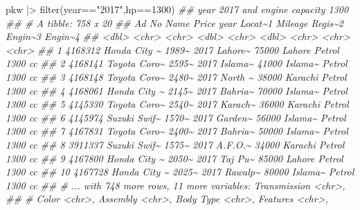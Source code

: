 \documentclass[
  letterpaper,
  DIV=11,
  numbers=noendperiod]{scrartcl}
\newenvironment{Shaded}{\begin{snugshade}}{\end{snugshade}}
\newcommand{\DecValTok}[1]{\textcolor[rgb]{0.68,0.00,0.00}{#1}}
\newcommand{\DocumentationTok}[1]{\textcolor[rgb]{0.37,0.37,0.37}{\textit{#1}}}
\newcommand{\FunctionTok}[1]{\textcolor[rgb]{0.28,0.35,0.67}{#1}}
\newcommand{\NormalTok}[1]{\textcolor[rgb]{0.00,0.23,0.31}{#1}}
\newcommand{\SpecialCharTok}[1]{\textcolor[rgb]{0.37,0.37,0.37}{#1}}
\newcommand{\StringTok}[1]{\textcolor[rgb]{0.13,0.47,0.30}{#1}}
\begin{document}
\begin{Shaded}
\begin{Highlighting}[]
\NormalTok{pkw }\SpecialCharTok{|\textgreater{}} \FunctionTok{filter}\NormalTok{(year}\SpecialCharTok{==}\StringTok{"2017"}\NormalTok{,hp}\SpecialCharTok{==}\DecValTok{1300}\NormalTok{) }\DocumentationTok{\#\# year 2017 and engine capacity 1300}
\DocumentationTok{\#\# \# A tibble: 758 x 20}
\DocumentationTok{\#\#    \textasciigrave{}Ad No\textasciigrave{} Name         Price  year Locat\textasciitilde{}1 Mileage Regis\textasciitilde{}2 Engin\textasciitilde{}3 Engin\textasciitilde{}4}
\DocumentationTok{\#\#      \textless{}dbl\textgreater{} \textless{}chr\textgreater{}        \textless{}chr\textgreater{} \textless{}dbl\textgreater{} \textless{}chr\textgreater{}     \textless{}dbl\textgreater{} \textless{}chr\textgreater{}   \textless{}chr\textgreater{}   \textless{}chr\textgreater{}  }
\DocumentationTok{\#\#  1 4168312 Honda City \textasciitilde{} 1989\textasciitilde{}  2017 Lahore\textasciitilde{}   75000 Lahore  Petrol  1300 cc}
\DocumentationTok{\#\#  2 4168141 Toyota Coro\textasciitilde{} 2595\textasciitilde{}  2017 Islama\textasciitilde{}   41000 Islama\textasciitilde{} Petrol  1300 cc}
\DocumentationTok{\#\#  3 4168148 Toyota Coro\textasciitilde{} 2480\textasciitilde{}  2017 North \textasciitilde{}   38000 Karachi Petrol  1300 cc}
\DocumentationTok{\#\#  4 4168061 Honda City \textasciitilde{} 2145\textasciitilde{}  2017 Bahria\textasciitilde{}   70000 Islama\textasciitilde{} Petrol  1300 cc}
\DocumentationTok{\#\#  5 4145330 Toyota Coro\textasciitilde{} 2540\textasciitilde{}  2017 Karach\textasciitilde{}   36000 Karachi Petrol  1300 cc}
\DocumentationTok{\#\#  6 4145974 Suzuki Swif\textasciitilde{} 1570\textasciitilde{}  2017 Garden\textasciitilde{}   56000 Islama\textasciitilde{} Petrol  1300 cc}
\DocumentationTok{\#\#  7 4167831 Toyota Coro\textasciitilde{} 2400\textasciitilde{}  2017 Bahria\textasciitilde{}   50000 Islama\textasciitilde{} Petrol  1300 cc}
\DocumentationTok{\#\#  8 3911337 Suzuki Swif\textasciitilde{} 1575\textasciitilde{}  2017 A.F.O.\textasciitilde{}   34000 Karachi Petrol  1300 cc}
\DocumentationTok{\#\#  9 4167800 Honda City \textasciitilde{} 2050\textasciitilde{}  2017 Taj Pu\textasciitilde{}   85000 Lahore  Petrol  1300 cc}
\DocumentationTok{\#\# 10 4167728 Honda City \textasciitilde{} 2025\textasciitilde{}  2017 Rawalp\textasciitilde{}   80000 Islama\textasciitilde{} Petrol  1300 cc}
\DocumentationTok{\#\# \# ... with 748 more rows, 11 more variables: Transmission \textless{}chr\textgreater{},}
\DocumentationTok{\#\# \#   Color \textless{}chr\textgreater{}, Assembly \textless{}chr\textgreater{}, \textasciigrave{}Body Type\textasciigrave{} \textless{}chr\textgreater{}, Features \textless{}chr\textgreater{},}

\end{Highlighting}
\end{Shaded}
\end{document}
